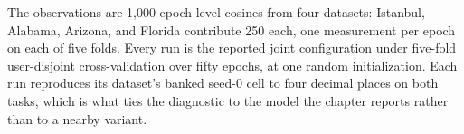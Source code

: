 The observations are 1,000 epoch-level cosines from four datasets: Istanbul, Alabama, Arizona, and
Florida contribute 250 each, one measurement per epoch on each of five folds. Every run is the
reported joint configuration under five-fold user-disjoint cross-validation over fifty epochs, at
one random initialization. Each run reproduces its dataset's banked seed-0 cell to four decimal
places on both tasks, which is what ties the
diagnostic to the model the chapter reports rather than to a nearby variant.

